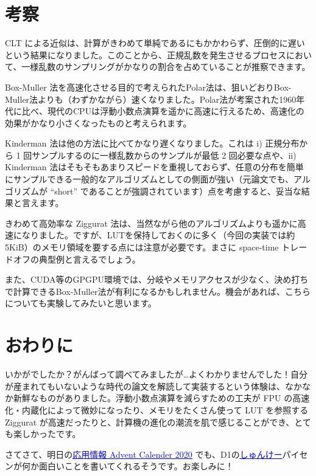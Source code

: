 \documentclass[twocolumn, dvipdfmx]{jsarticle}
\begin{document}
\section*{考察}

CLT による近似は、計算がきわめて単純であるにもかかわらず、圧倒的に遅いという結果になりました。このことから、正規乱数を発生させるプロセスにおいて、一様乱数のサンプリングがかなりの割合を占めていることが推察できます。

Box-Muller 法を高速化させる目的で考えられたPolar法は、狙いどおりBox-Muller法よりも（わずかながら）速くなりました。Polar法が考案された1960年代に比べ、現代のCPUは浮動小数点演算を遥かに高速に行えるため、高速化の効果がかなり小さくなったものと考えられます。

Kinderman 法は他の方法に比べてかなり遅くなりました。これは i) 正規分布から 1 回サンプルするのに一様乱数からのサンプルが最低 2 回必要な点や、ii) Kinderman 法はそもそもあまりスピードを重視しておらず、任意の分布を簡単にサンプルできる一般的なアルゴリズムとしての側面が強い（元論文でも、アルゴリズムが ``short'' であることが強調されています）点を考慮すると、妥当な結果と言えます。

きわめて高効率な Ziggurat 法は、当然ながら他のアルゴリズムよりも遥かに高速になりました。ですが、LUTを保持しておくのに多く（今回の実装では約5KiB）のメモリ領域を要する点には注意が必要です。まさに space-time トレードオフの典型例と言えるでしょう。

また、CUDA等のGPGPU環境では、分岐やメモリアクセスが少なく、決め打ちで計算できるBox-Muller法が有利になるかもしれません。機会があれば、こちらについても実験してみたいと思います。

\section*{おわりに}

いかがでしたか？がんばって調べてみましたが…よくわかりませんでした！自分が産まれてもいないような時代の論文を解読して実装するという体験は、なかなか新鮮なものがありました。浮動小数点演算を減らすための工夫が FPU の高速化・内蔵化によって微妙になったり、メモリをたくさん使って LUT を参照する Ziggurat が高速だったりと、計算機の進化の潮流を肌で感じることができ、とても楽しかったです。

さてさて、明日の\href{https://adventar.org/calendars/5671}{\textcolor{blue}{\underline{応用情報 Advent Calender 2020}}} でも、D1の\href{https://twitter.com/shunk031}{\textcolor{blue}{\underline{しゅんけー}}}パイセンが何か面白いことを書いてくれるそうです。お楽しみに！



\end{document}
